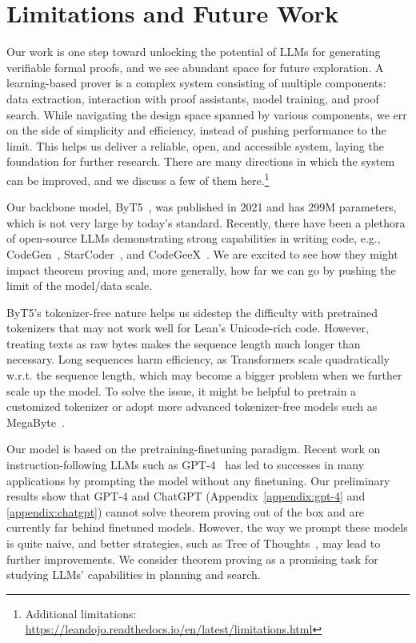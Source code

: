 \section{Limitations and Future Work}
\label{appendix:limitations}


Our work is one step toward unlocking the potential of LLMs for generating verifiable formal proofs, and we see abundant space for future exploration. A learning-based prover is a complex system consisting of multiple components: data extraction, interaction with proof assistants, model training, and proof search. While navigating the design space spanned by various components, we err on the side of simplicity and efficiency, instead of pushing performance to the limit. This helps us deliver a reliable, open, and accessible system, laying the foundation for further research. There are many directions in which the system can be improved, and we discuss a few of them here.\footnote{Additional limitations: \url{https://leandojo.readthedocs.io/en/latest/limitations.html}}


Our backbone model, ByT5~\cite{xue2022byt5}, was published in 2021 and has 299M parameters, which is not very large by today's standard. Recently, there have been a plethora of open-source LLMs demonstrating strong capabilities in writing code, e.g., CodeGen~\cite{nijkamp2022codegen},  StarCoder~\cite{li2023starcoder}, and CodeGeeX~\cite{zheng2023codegeex}. We are excited to see how they might impact theorem proving and, more generally, how far we can go by pushing the limit of the model/data scale. 

ByT5's tokenizer-free nature helps us sidestep the difficulty with pretrained tokenizers that may not work well for Lean's Unicode-rich code. However, treating texts as raw bytes makes the sequence length much longer than necessary. Long sequences harm efficiency, as Transformers scale quadratically w.r.t. the sequence length, which may become a bigger problem when we further scale up the model. To solve the issue, it might be helpful to pretrain a customized tokenizer or adopt more advanced tokenizer-free models such as MegaByte~\cite{yu2023megabyte}.


Our {\name} model is based on the pretraining-finetuning paradigm. Recent work on instruction-following LLMs such as GPT-4~\cite{openai2023gpt4} has led to successes in many applications by prompting the model without any finetuning. Our preliminary results show that GPT-4 and ChatGPT (Appendix~\ref{appendix:gpt-4} and \ref{appendix:chatgpt}) cannot solve theorem proving out of the box and are currently far behind finetuned models. However, the way we prompt these models is quite naive, and better strategies, such as Tree of Thoughts~\cite{yao2023tree}, may lead to further improvements. We consider theorem proving as a promising task for studying LLMs' capabilities in planning and search.



